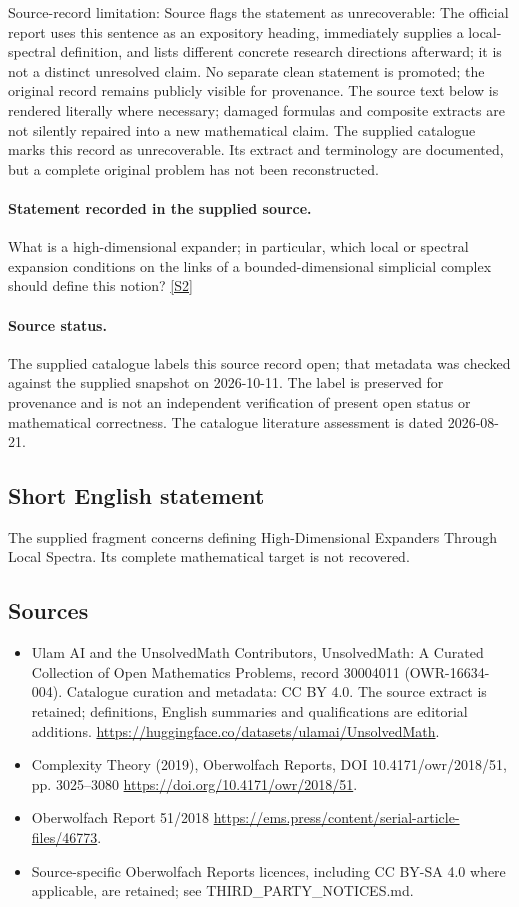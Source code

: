 \documentclass[11pt]{article}
\begin{document}
Source-record limitation: Source flags the statement as unrecoverable: The official report uses this sentence as an expository heading, immediately supplies a local-spectral definition, and lists different concrete research directions afterward; it is not a distinct unresolved claim. No separate clean statement is promoted; the original record remains publicly visible for provenance.
The source text below is rendered literally where necessary; damaged formulas and composite extracts are not silently repaired into a new mathematical claim.
The supplied catalogue marks this record as unrecoverable. Its extract and terminology are documented, but a complete original problem has not been reconstructed.
\paragraph{Statement recorded in the supplied source.}
What is a high-dimensional expander; in particular, which local or spectral expansion conditions on the links of a bounded-dimensional simplicial complex should define this notion? \href{https://doi.org/10.4171/owr/2018/51}{[S2]}
\paragraph{Source status.}
The supplied catalogue labels this source record open; that metadata was checked against the supplied snapshot on 2026-10-11. The label is preserved for provenance and is not an independent verification of present open status or mathematical correctness. The catalogue literature assessment is dated 2026-08-21.
\subsection{Short English statement}
The supplied fragment concerns defining High-Dimensional Expanders Through Local Spectra. Its complete mathematical target is not recovered.
\subsection{Sources}
\begin{itemize}
\item[S1] Ulam AI and the UnsolvedMath Contributors, UnsolvedMath: A Curated Collection of Open Mathematics Problems, record 30004011 (OWR-16634-004). Catalogue curation and metadata: CC BY 4.0. The source extract is retained; definitions, English summaries and qualifications are editorial additions.
\url{https://huggingface.co/datasets/ulamai/UnsolvedMath}.
\item[S2] Complexity Theory (2019), Oberwolfach Reports, DOI 10.4171/owr/2018/51, pp. 3025--3080
\url{https://doi.org/10.4171/owr/2018/51}.
\item[S3] Oberwolfach Report 51/2018
\url{https://ems.press/content/serial-article-files/46773}.
\item Source-specific Oberwolfach Reports licences, including CC BY-SA 4.0 where applicable, are retained; see THIRD\_PARTY\_NOTICES.md.
\end{itemize}
\end{document}
